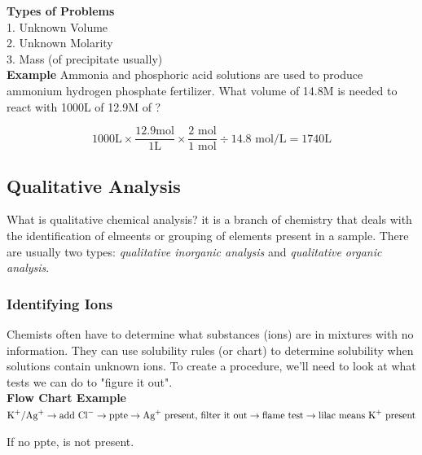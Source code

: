 \documentclass[11pt]{article}
\begin{document}
    \textbf{Types of Problems} \\
    1. Unknown Volume \\
    2. Unknown Molarity \\
    3. Mass (of precipitate usually) \\

    \textbf{Example} Ammonia and phosphoric acid solutions are used to produce ammonium hydrogen phosphate fertilizer. What volume of 14.8M  is needed to react with 1000L of 12.9M of ?

    \begin{center}
    \end{center}

    \begin{equation*}
        1000 \text{L} \times \frac{12.9 \text{mol}}{1 \text{L}} \times \frac{2 \text{ mol}}{1 \text{ mol}} \div 14.8 \text{ mol/L} = 1740\text{L}
    \end{equation*}

    \subsection{Qualitative Analysis}
    What is qualitative chemical analysis? it is a branch of chemistry that deals with the identification of elmeents or grouping of elements present in a sample. There are usually two types: \emph{qualitative inorganic analysis} and \emph{qualitative organic analysis}.

    \subsubsection{Identifying Ions}
    Chemists often have to determine what substances (ions) are in mixtures with no information. They can use solubility rules (or chart) to determine solubility when solutions contain unknown ions. To create a procedure, we'll need to look at what tests we can do to "figure it out". \\
    \newpage
    \textbf{Flow Chart Example} \\

    $\ce{K^{+}/Ag^{+}} \rightarrow \text{add } \ce{Cl^{-}} \rightarrow \text{ppte} \rightarrow \ce{Ag^{+}} \text{ present, filter it out} \rightarrow \text{flame test} \rightarrow \text{lilac means \ce{K^{+}}} \text{ present} $

    If no ppte,  is not present.
\end{document}
